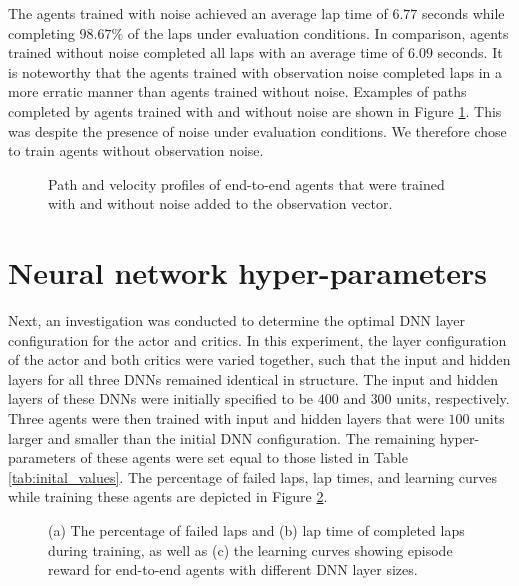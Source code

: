 The agents trained with noise achieved an average lap time of $6.77$ seconds while completing $98.67\%$ of the laps under evaluation conditions. 
In comparison, agents trained without noise completed all laps with an average time of $6.09$ seconds.
It is noteworthy that the agents trained with observation noise completed laps in a more erratic manner than agents trained without noise.
Examples of paths completed by agents trained with and without noise are shown in Figure \ref{fig:noise_lap}.
This was despite the presence of noise under evaluation conditions.
We therefore chose to train agents without observation noise.

\begin{figure}[htb!]
    \centering
    
    \caption[Path and velocity profiles of end-to-end agents that were trained with and without noise added to the observation vector]{Path and velocity profiles of end-to-end agents that were trained with and without noise added to the observation vector.}
    \label{fig:noise_lap}
\end{figure}




\section{Neural network hyper-parameters}

Next, an investigation was conducted to determine the optimal DNN layer configuration for the actor and critics.
In this experiment, the layer configuration of the actor and both critics were varied together, such that the input and hidden layers for all three DNNs remained identical in structure.
The input and hidden layers of these DNNs were initially specified to be $400$ and $300$ units, respectively.
Three agents were then trained with input and hidden layers that were $100$ units larger and smaller than the initial DNN configuration.
The remaining hyper-parameters of these agents were set equal to those listed in Table \ref{tab:inital_values}.
The percentage of failed laps, lap times, and learning curves while training these agents are depicted in Figure \ref{fig:layer_sizes}.

\begin{figure}[htb!]
    \centering
    
    \caption[Learning curves for tuning the target update rate]{(a) The percentage of failed laps and (b) lap time of completed laps during training, as well as (c) the learning curves showing episode reward for end-to-end agents with different DNN layer sizes.}
    \label{fig:layer_sizes}
\end{figure}


